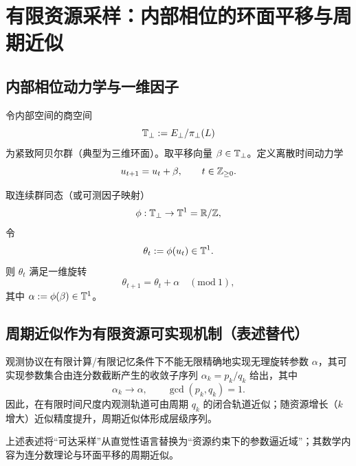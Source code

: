 \section{有限资源采样：内部相位的环面平移与周期近似}

\subsection{内部相位动力学与一维因子}

\begin{definition}[内部相位平移]\label{def:internal-phase-translation}
令内部空间的商空间
\[
\mathbb{T}_{\perp}:=E_{\perp}/\pi_{\perp}(L)
\]
为紧致阿贝尔群（典型为三维环面）。取平移向量 $\beta\in \mathbb{T}_{\perp}$。定义离散时间动力学
\[
u_{t+1}=u_t+\beta,\qquad t\in\mathbb{Z}_{\ge 0}.
\]
\end{definition}

\begin{definition}[一维观测因子]\label{def:one-dimensional-factor}
取连续群同态（或可测因子映射）
\[
\phi:\mathbb{T}_{\perp}\to \mathbb{T}^1=\mathbb{R}/\mathbb{Z},
\]
令
\[
\theta_t:=\phi(u_t)\in\mathbb{T}^1.
\]
则 $\theta_t$ 满足一维旋转
\[
\theta_{t+1}=\theta_t+\alpha\quad (\mathrm{mod}\ 1),
\]
其中 $\alpha:=\phi(\beta)\in \mathbb{T}^1$。
\end{definition}

\subsection{周期近似作为有限资源可实现机制（表述替代）}

\begin{assumption}[有限资源近似原则]\label{assump:finite-resource-cf}
观测协议在有限计算/有限记忆条件下不能无限精确地实现无理旋转参数 $\alpha$，其可实现参数集合由连分数截断产生的收敛子序列 $\alpha_k=p_k/q_k$ 给出，其中
\[
\alpha_k\to \alpha,\qquad \gcd(p_k,q_k)=1.
\]
因此，在有限时间尺度内观测轨道可由周期 $q_k$ 的闭合轨道近似；随资源增长（$k$ 增大）近似精度提升，周期近似体形成层级序列。
\end{assumption}

\begin{remark}
上述表述将“可达采样”从直觉性语言替换为“资源约束下的参数逼近域”；其数学内容为连分数理论与环面平移的周期近似。
\end{remark}

